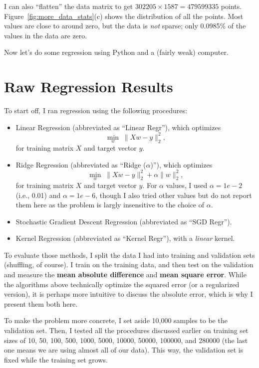 \documentclass[a4paper, 11pt]{article}
\begin{document}
I can also ``flatten'' the data matrix to get $302205\times 1587 = 479599335$ points.
Figure~\ref{fig:more_data_stats}(c) shows the distribution of all the points. Most values are close
to around zero, but the data is \emph{not} sparse; only 0.0985\% of the values in the data are zero.

Now let's do some regression using Python and a (fairly weak) computer.



\section{Raw Regression Results}

To start off, I ran regression using the following procedures:

\begin{itemize}
    \item Linear Regression (abbreviated as ``Linear Regr''), which optimizes
\[
\min_w \; \|Xw - y\|_2^2,
\]
    for training matrix $X$ and target vector $y$.
    \item Ridge Regression (abbreviated as ``Ridge ($\alpha$)''), which optimizes
\[
\min_w \; \|Xw - y\|_2^2 + \alpha \|w\|_2^2,
\]
    for training matrix $X$ and target vector $y$. For $\alpha$ values, I used $\alpha = 1e-2$
    (i.e., 0.01) and $\alpha = 1e-6$, though I also tried other values but do not report them here
    as the problem is largly insensitive to the choice of $\alpha$.

    \item Stochastic Gradient Descent Regression (abbreviated as ``SGD Regr'').
    \item Kernel Regression (abbreviated as ``Kernel Regr''), with a \emph{linear} kernel.
\end{itemize}

To evaluate those methods, I split the data I had into training and validation sets (shuffling, of
course). I train on the training data, and then test on the validation and measure the \textbf{mean
absolute difference} and \textbf{mean square error}. While the algorithms above technically optimize
the squared error (or a regularized version), it is perhaps more intuitive to discuss the absolute
error, which is why I present them both here.

To make the problem more concrete, I set aside 10,000 samples to be the validation set. Then, I
tested all the procedures discussed earlier on training set sizes of 10, 50, 100, 500, 1000, 5000,
10000, 50000, 100000, and 280000 (the last one means we are using almost all of our data). This way,
the validation set is fixed while the training set grows.
\end{document}
